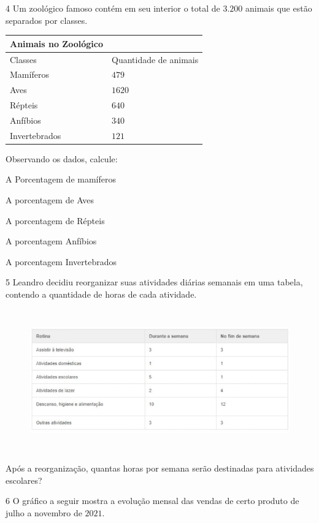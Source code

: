 {\num{4}  Um zoológico famoso contém em seu interior o total de $3.200$ animais
que estão separados por classes.

\begin{longtable}[]{@{}ll@{}}
\toprule
Animais no Zoológico &\tabularnewline
\midrule
\endhead
Classes & Quantidade de animais\tabularnewline
Mamíferos & $479$\tabularnewline
Aves & $1620$\tabularnewline
Répteis & $640$\tabularnewline
Anfíbios & $340$\tabularnewline
Invertebrados & $121$\tabularnewline
\bottomrule
\end{longtable}

Observando os dados, calcule:

\begin{escolha}
\item A Porcentagem de mamíferos 
\item A porcentagem de Aves 
\item A porcentagem de Répteis 
\item A porcentagem Anfíbios 
\item A porcentagem Invertebrados 
\end{escolha}

\num{5}  Leandro decidiu reorganizar suas atividades diárias semanais em uma
tabela, contendo a quantidade de horas de cada atividade.

\begin{figure}
\includegraphics[width=5.90556in,height=2.41638in]{./imgSAEB_6_MAT/media/image83.png}
\end{figure}

Após a reorganização, quantas horas por semana serão destinadas para
atividades escolares?


\num{6}  O gráfico a seguir mostra a evolução mensal das vendas de certo
produto de julho a novembro de $2021$.

}
